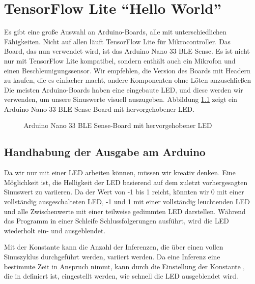 %
%
%
%



\chapter{TensorFlow Lite ``Hello World''}

Es gibt eine große Auswahl an Arduino-Boards, alle mit unterschiedlichen Fähigkeiten. Nicht auf allen läuft TensorFlow Lite für Mikrocontroller. Das Board, das nun verwendet wird, ist das Arduino Nano 33 BLE Sense. Es ist nicht nur mit TensorFlow Lite kompatibel, sondern enthält auch ein Mikrofon und einen Beschleunigungssensor. Wir empfehlen, die Version des Boards mit Headern zu kaufen, die es einfacher macht, andere Komponenten ohne Löten anzuschließen Die meisten Arduino-Boards haben eine eingebaute LED, und diese werden wir verwenden, um unsere Sinuswerte visuell auszugeben. Abbildung \ref{fig:NanoLED} zeigt ein Arduino Nano 33 BLE Sense-Board mit hervorgehobener LED.

\begin{figure}
  \centering
  
  \caption{ Arduino Nano 33 BLE Sense-Board mit hervorgehobener LED}\label{fig:NanoLED}
\end{figure}


 \section{Handhabung der Ausgabe am Arduino}
 
 Da wir nur mit einer LED arbeiten können, müssen wir kreativ denken. Eine Möglichkeit ist, die Helligkeit der LED basierend auf dem zuletzt vorhergesagten Sinuswert zu variieren.  Da der Wert von -1 bis 1 reicht, könnten wir 0 mit einer vollständig ausgeschalteten LED, -1 und 1 mit einer vollständig leuchtenden LED und alle Zwischenwerte mit einer teilweise gedimmten LED darstellen. Während das Programm in einer Schleife Schlussfolgerungen ausführt, wird die LED wiederholt ein- und ausgeblendet.

Mit der Konstante  kann die Anzahl der Inferenzen, die über einen vollen Sinuszyklus durchgeführt werden, variiert werden. Da eine Inferenz eine bestimmte Zeit in Anspruch nimmt, kann durch die Einstellung der Konstante , die in  definiert ist, eingestellt werden, wie schnell die LED ausgeblendet wird.
 
